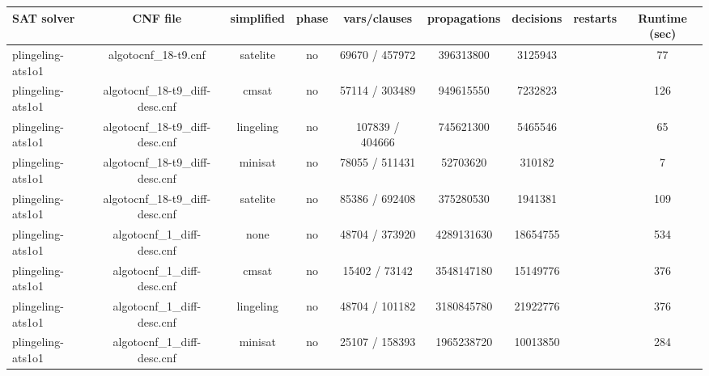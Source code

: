 \begin{appendices}
\begin{table}[p]
  \begin{center}
    \begin{tabular}{l|cccccccc}
        \textbf{SAT solver} & \textbf{CNF file} & \textbf{simplified} & \textbf{phase} & \textbf{vars/clauses} & \textbf{propagations} & \textbf{decisions} & \textbf{restarts} & \textbf{Runtime (sec)} \\
      \hline
  plingeling-ats1o1              & algotocnf\_18-t9.cnf           & satelite   & no    & 69670 / 457972 & 396313800 & 3125943   &            & 77 \\ %
  plingeling-ats1o1              & algotocnf\_18-t9\_diff-desc.cnf & cmsat      & no    & 57114 / 303489 & 949615550 & 7232823   &            & 126 \\ %
  plingeling-ats1o1              & algotocnf\_18-t9\_diff-desc.cnf & lingeling  & no    & 107839 / 404666 & 745621300 & 5465546   &            & 65 \\ %
  plingeling-ats1o1              & algotocnf\_18-t9\_diff-desc.cnf & minisat    & no    & 78055 / 511431 & 52703620  & 310182    &            & 7 \\ %
  plingeling-ats1o1              & algotocnf\_18-t9\_diff-desc.cnf & satelite   & no    & 85386 / 692408 & 375280530 & 1941381   &            & 109 \\ %
  plingeling-ats1o1              & algotocnf\_1\_diff-desc.cnf    & none       & no    & 48704 / 373920 & 4289131630 & 18654755  &            & 534 \\ %
  plingeling-ats1o1              & algotocnf\_1\_diff-desc.cnf    & cmsat      & no    & 15402 / 73142 & 3548147180 & 15149776  &            & 376 \\ %
  plingeling-ats1o1              & algotocnf\_1\_diff-desc.cnf    & lingeling  & no    & 48704 / 101182 & 3180845780 & 21922776  &            & 376 \\ %
  plingeling-ats1o1              & algotocnf\_1\_diff-desc.cnf    & minisat    & no    & 25107 / 158393 & 1965238720 & 10013850  &            & 284 \\ %

\end{tabular}
\end{center}
\end{table}
\end{appendices}
